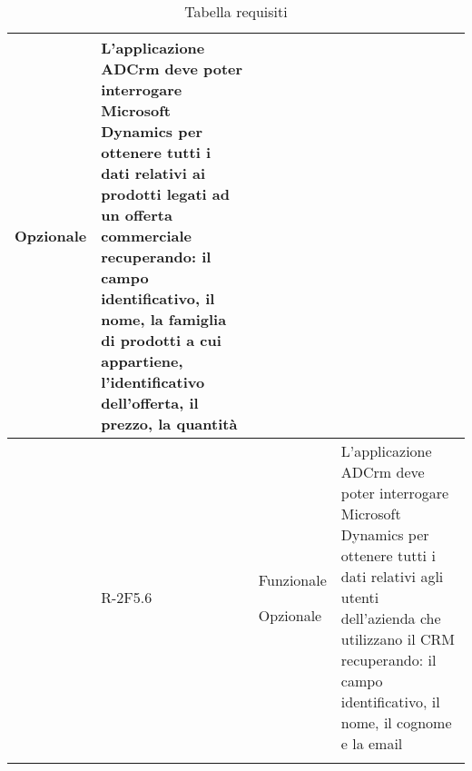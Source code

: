 \begin{longtable}{|r l|p{2.5cm}|p{10cm}|}
	Opzionale & L'applicazione ADCrm deve poter interrogare Microsoft Dynamics per ottenere tutti i dati relativi ai prodotti legati ad un offerta commerciale recuperando: il campo identificativo, il nome, la famiglia di prodotti a cui appartiene, l'identificativo dell'offerta, il prezzo, la quantità\tabularnewline
	\hline
	& R-2F5.6 & Funzionale
	
	Opzionale & L'applicazione ADCrm deve poter interrogare Microsoft Dynamics per ottenere tutti i dati relativi agli utenti dell'azienda che utilizzano il \gls{CRM} recuperando: il campo identificativo, il nome, il cognome e la email\tabularnewline
	\hline
	\caption{Tabella requisiti} 
	\tabularnewline
\end{longtable}
